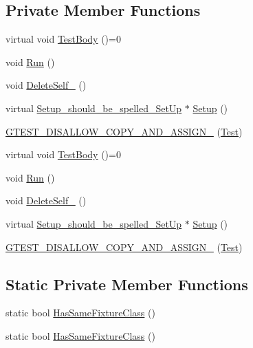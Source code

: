 \subsection*{\-Private \-Member \-Functions}
\begin{DoxyCompactItemize}
\item 
virtual void \hyperlink{classtesting_1_1Test_a925baf8f1ea1e3ff5421bf2dbfa9a778}{\-Test\-Body} ()=0
\item 
void \hyperlink{classtesting_1_1Test_aa3eca255b6be227d7d901cc2a72017a5}{\-Run} ()
\item 
void \hyperlink{classtesting_1_1Test_a596a17de4388a65184028210bc5bbecb}{\-Delete\-Self\-\_\-} ()
\item 
virtual \*
\hyperlink{structtesting_1_1Test_1_1Setup__should__be__spelled__SetUp}{\-Setup\-\_\-should\-\_\-be\-\_\-spelled\-\_\-\-Set\-Up} $\ast$ \hyperlink{classtesting_1_1Test_adf12eafecf227c1587f58f90f1a221c3}{\-Setup} ()
\item 
\hyperlink{classtesting_1_1Test_a75c6d865199f4e27bab851e43470669d}{\-G\-T\-E\-S\-T\-\_\-\-D\-I\-S\-A\-L\-L\-O\-W\-\_\-\-C\-O\-P\-Y\-\_\-\-A\-N\-D\-\_\-\-A\-S\-S\-I\-G\-N\-\_\-} (\hyperlink{classtesting_1_1Test}{\-Test})
\item 
virtual void \hyperlink{classtesting_1_1Test_a925baf8f1ea1e3ff5421bf2dbfa9a778}{\-Test\-Body} ()=0
\item 
void \hyperlink{classtesting_1_1Test_aa3eca255b6be227d7d901cc2a72017a5}{\-Run} ()
\item 
void \hyperlink{classtesting_1_1Test_a596a17de4388a65184028210bc5bbecb}{\-Delete\-Self\-\_\-} ()
\item 
virtual \*
\hyperlink{structtesting_1_1Test_1_1Setup__should__be__spelled__SetUp}{\-Setup\-\_\-should\-\_\-be\-\_\-spelled\-\_\-\-Set\-Up} $\ast$ \hyperlink{classtesting_1_1Test_adf12eafecf227c1587f58f90f1a221c3}{\-Setup} ()
\item 
\hyperlink{classtesting_1_1Test_a75c6d865199f4e27bab851e43470669d}{\-G\-T\-E\-S\-T\-\_\-\-D\-I\-S\-A\-L\-L\-O\-W\-\_\-\-C\-O\-P\-Y\-\_\-\-A\-N\-D\-\_\-\-A\-S\-S\-I\-G\-N\-\_\-} (\hyperlink{classtesting_1_1Test}{\-Test})
\end{DoxyCompactItemize}
\subsection*{\-Static \-Private \-Member \-Functions}
\begin{DoxyCompactItemize}
\item 
static bool \hyperlink{classtesting_1_1Test_a33853de09fa3a19530ef4db93e81d4a9}{\-Has\-Same\-Fixture\-Class} ()
\item 
static bool \hyperlink{classtesting_1_1Test_a3ffa7d515fb8f9709dde9f679772b735}{\-Has\-Same\-Fixture\-Class} ()
\end{DoxyCompactItemize}
